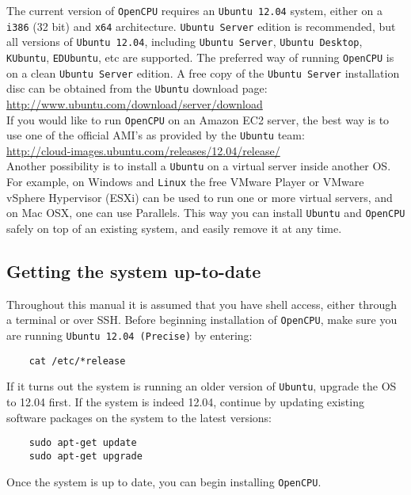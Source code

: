 \documentclass{scrartcl}
\begin{document}
\noindent The current version of \texttt{OpenCPU} requires an \texttt{Ubuntu
12.04} system, either on a \texttt{i386} (32 bit) and \texttt{x64} architecture.
\texttt{Ubuntu Server} edition is recommended, but all versions of
\texttt{Ubuntu 12.04}, including \texttt{Ubuntu Server}, \texttt{Ubuntu
Desktop}, \texttt{KUbuntu}, \texttt{EDUbuntu}, etc are supported. The preferred
way of running \texttt{OpenCPU} is on a clean \texttt{Ubuntu Server} edition. A
free copy of the \texttt{Ubuntu Server} installation disc can be obtained from
the \texttt{Ubuntu} download page: \\

\url{http://www.ubuntu.com/download/server/download} \\

\noindent If you would like to run \texttt{OpenCPU} on an Amazon EC2 server, the best way
is to use one of the official AMI's as provided by the \texttt{Ubuntu} team: \\

\url{http://cloud-images.ubuntu.com/releases/12.04/release/} \\

\noindent Another possibility is to install a \texttt{Ubuntu} on a virtual server inside
another OS. For example, on Windows and \texttt{Linux} the free VMware Player or VMware
vSphere Hypervisor (ESXi) can be used to run one or more virtual servers, and on
Mac OSX, one can use Parallels. This way you can install \texttt{Ubuntu} and \texttt{OpenCPU}
safely on top of an existing system, and easily remove it at any time.

\subsection{Getting the system up-to-date}

\noindent Throughout this manual it is assumed that you have shell access,
either through a terminal or over SSH. Before beginning installation of
\texttt{OpenCPU}, make sure you are running \texttt{Ubuntu 12.04 (Precise)} by
entering:

\begin{verbatim}
    cat /etc/*release
\end{verbatim}
If it turns out the system is running an older version of \texttt{Ubuntu}, upgrade the OS
to 12.04 first. If the system is indeed 12.04, continue by updating existing
software packages on the system to the latest versions:

\begin{verbatim}
    sudo apt-get update
    sudo apt-get upgrade
\end{verbatim}
Once the system is up to date, you can begin installing \texttt{OpenCPU}.
\end{document}
